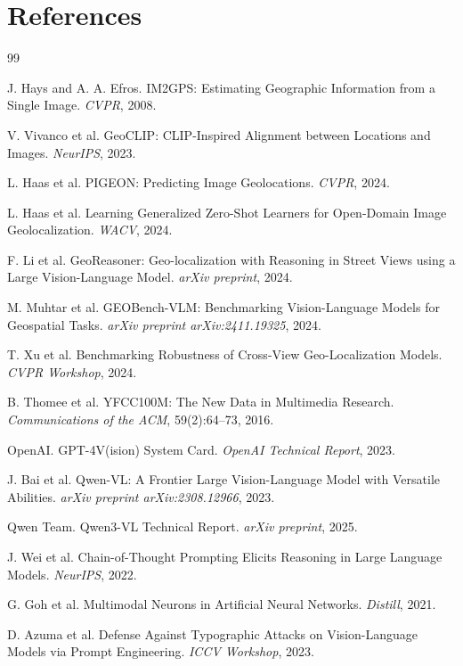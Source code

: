 \documentclass[12pt,a4paper]{article}
\begin{document}
\section*{References}
\begin{thebibliography}{99}

J. Hays and A. A. Efros. IM2GPS: Estimating Geographic Information from a Single Image. \emph{CVPR}, 2008.

V. Vivanco et al. GeoCLIP: CLIP-Inspired Alignment between Locations and Images. \emph{NeurIPS}, 2023.

L. Haas et al. PIGEON: Predicting Image Geolocations. \emph{CVPR}, 2024.

L. Haas et al. Learning Generalized Zero-Shot Learners for Open-Domain Image Geolocalization. \emph{WACV}, 2024.

F. Li et al. GeoReasoner: Geo-localization with Reasoning in Street Views using a Large Vision-Language Model. \emph{arXiv preprint}, 2024.

M. Muhtar et al. GEOBench-VLM: Benchmarking Vision-Language Models for Geospatial Tasks. \emph{arXiv preprint arXiv:2411.19325}, 2024.

T. Xu et al. Benchmarking Robustness of Cross-View Geo-Localization Models. \emph{CVPR Workshop}, 2024.

B. Thomee et al. YFCC100M: The New Data in Multimedia Research. \emph{Communications of the ACM}, 59(2):64--73, 2016.

OpenAI. GPT-4V(ision) System Card. \emph{OpenAI Technical Report}, 2023.

J. Bai et al. Qwen-VL: A Frontier Large Vision-Language Model with Versatile Abilities. \emph{arXiv preprint arXiv:2308.12966}, 2023.

Qwen Team. Qwen3-VL Technical Report. \emph{arXiv preprint}, 2025.

J. Wei et al. Chain-of-Thought Prompting Elicits Reasoning in Large Language Models. \emph{NeurIPS}, 2022.

G. Goh et al. Multimodal Neurons in Artificial Neural Networks. \emph{Distill}, 2021.

D. Azuma et al. Defense Against Typographic Attacks on Vision-Language Models via Prompt Engineering. \emph{ICCV Workshop}, 2023.


\end{thebibliography}
\end{document}
